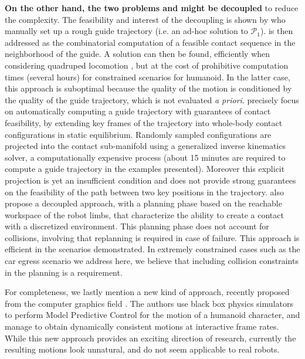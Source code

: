 \textbf{On the other hand, the two problems \Pa and \Pb might be decoupled} to reduce the complexity. The feasibility and interest of the decoupling is shown by \citeauthor{DBLP:conf/iser/EscandeKMG08} who manually set up a rough guide trajectory (i.e. an ad-hoc solution to $\mathcal{P}_1$). \Pb  is then addressed as the combinatorial computation of a feasible contact sequence in the neighborhood of the guide. A solution can then be found, efficiently when considering quadruped locomotion \citep{kalakrishnan2011learning}, but at the cost of prohibitive computation times (several hours) for constrained scenarios for humanoid. In the latter case, this approach is suboptimal because the quality of the motion is conditioned by the quality of the guide trajectory,  which is not evaluated \textit{a priori}. \citeauthor{Bouyarmane2009} precisely focus on automatically computing a guide trajectory with guarantees of contact feasibility, by extending key frames of the trajectory into whole-body contact configurations in static equilibrium. Randomly sampled configurations are projected into the contact sub-manifold using a generalized inverse kinematics solver, a computationally expensive process (about 15 minutes are required to compute a guide trajectory in the examples presented). Moreover this explicit projection is yet an insufficient condition and does not provide strong guarantees on the feasibility of the path between two key positions in the trajectory. \citeauthor{7140082} also propose a decoupled approach, with a planning phase based on the reachable workspace of the robot limbs, that characterize the ability to create a contact with 
a discretized environment. This planning phase does not account for collisions, involving that replanning is required in case of failure. This approach is efficient 
in the scenarios demonstrated. In extremely constrained cases such 
as the car egress scenario we address here, we believe that including collision constraints in the planning is a requirement.

For completeness, we lastly mention a new kind of approach, recently proposed from the computer graphics field \citep{hamalainen_cpbp_2015}. The authors
use black box physics simulators to perform Model Predictive Control for the motion of a humanoid character, and manage to obtain dynamically consistent motions
at interactive frame rates. While this new approach provides an exciting direction of research, currently the resulting motions
look unnatural, and do not seem applicable to real robots.

